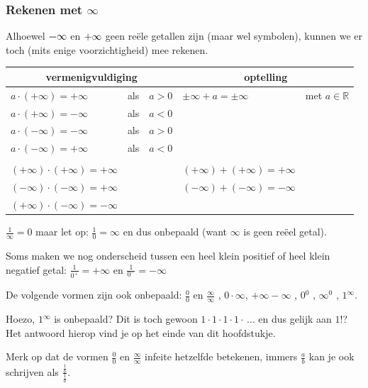 \subsubsection{Rekenen met $\infty$}

Alhoewel $\text{\textminus\ensuremath{\infty}}$ en $+\text{\ensuremath{\infty}}$
geen re\"ele getallen zijn (maar wel symbolen), kunnen we er toch (mits
enige voorzichtigheid) mee rekenen.



\begin{tabel*}{}
	\centering
	\begin{tabular}{lcc|ll}
		\multicolumn{3}{c|}{vermenigvuldiging} & \multicolumn{2}{c}{optelling}\\
		\hline 
		$a\cdot (+\infty)=+\infty$ & als & $a>0$ & $\pm\infty+a=\pm\infty$ & met $a\in\mathbb{R}$\\
		$a\cdot (+\infty)=-\infty$ & als & $a<0$ &  & \\
		$a\cdot (-\infty)=-\infty$ & als & $a>0$ &  & \\
		$a\cdot (-\infty)=+\infty$ & als & $a<0$ &  & \\
		&  &  &  & \\
		$(+\infty)\cdot (+\infty)=+\infty$ &  &   & $(+\infty)+(+\infty)=+\infty$ & \\
		$(-\infty)\cdot (-\infty)=+\infty$ &  &   & $(-\infty)+(-\infty)=-\infty$ & \\
		$(+\infty)\cdot (-\infty)=-\infty$ &  &   &  & \\
	\end{tabular}
\end{tabel*}




$\frac{1}{\infty}=0$ maar let op: $\frac{1}{0}=\infty$
en dus onbepaald (want $\infty$ is geen re\"eel getal).

Soms maken we nog onderscheid tussen een heel klein positief
of heel klein negatief getal: $\frac{1}{0^{+}}=+\infty$ en $\frac{1}{0^{-}}=-\infty$




De volgende vormen zijn ook onbepaald: $\frac{0}{0}$ en
$\frac{\infty}{\infty}$ , $0\cdot \infty$, $+\infty-\infty$ , $0{}^{0}$
, $\infty{}^{0}$ , $1{}^{\infty}$.

Hoezo, $1{}^{\infty}$ is onbepaald? Dit is toch gewoon
$1\cdot 1\cdot 1\cdot 1\cdot \,\ldots$ en dus gelijk aan $1$!? Het antwoord hierop vind
je op het einde van dit hoofdstukje.

Merk op dat de vormen $\frac{0}{0}$ en $\frac{\infty}{\infty}$
infeite hetzelfde betekenen, immers $\frac{a}{b}$ kan je ook schrijven
als $\frac{\frac{1}{b}}{\frac{1}{a}}$.

